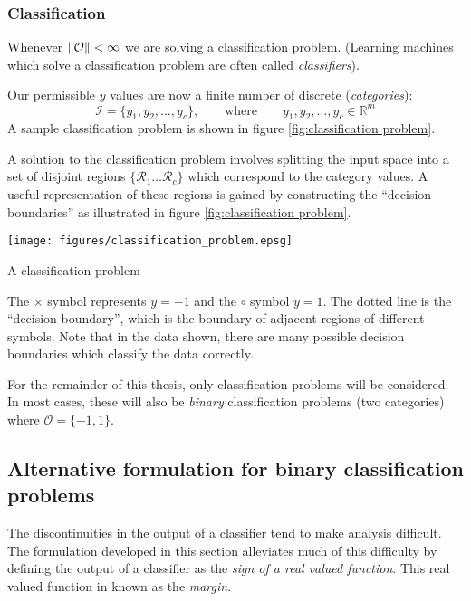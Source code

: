\subsubsection{Classification}
\label{sec:classification}

Whenever $\|\mathcal{O}\| < \infty$ we are solving a classification
problem.  (Learning machines which solve a classification problem are
often called \emph{classifiers}).

Our permissible $y$ values are now a finite number of discrete
(\emph{categories}):
%
\begin{equation}
\mathcal{I} = \{y_1, y_2, \ldots, y_c\}, \qquad \mbox{where} \qquad y_1, y_2,
\ldots, y_c \in \mathbb{R}^m
\end{equation}
%
A sample classification problem is shown in
figure \ref{fig:classification problem}.

A solution to the classification problem involves splitting the input space
into a set of disjoint regions $\{ \mathcal{R}_1 \ldots \mathcal{R}_c
\}$ which correspond to the category values.  A useful representation
of these regions is gained by constructing the ``decision boundaries''
as illustrated in figure \ref{fig:classification problem}.

\begin{linefigure}
\begin{center}
\texttt{[image: figures/classification\_problem.epsg]}
\end{center}
\caption{A classification problem}
\label{fig:classification problem}
The $\times$ symbol represents $y=-1$ and the $\circ$ symbol $y=1$.
The dotted line is the ``decision boundary'', which is the boundary of
adjacent regions of different symbols.  Note that in the data shown,
there are many possible decision boundaries which classify the data
correctly.
\end{linefigure}

For the remainder of this thesis, only classification problems will be
considered.  In most cases, these will also be \emph{binary}
classification problems (two categories) where $\mathcal{O} = \{-1,
1\}$.

\subsection{Alternative formulation for binary classification problems}
\label{sec:margin formulation}
The discontinuities in the output of a classifier tend to make
analysis difficult.  The formulation developed in this section
alleviates much of this difficulty by defining the output of a
classifier as the  \emph{sign of a real valued function}.  This real
valued function in known as the \emph{margin}.

